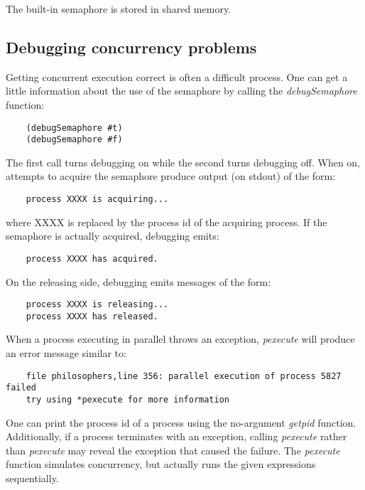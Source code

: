 The built-in semaphore is stored in shared memory.

\subsection{Debugging concurrency problems}

Getting concurrent execution correct is often a difficult process.
One can get a little information about the use of the semaphore 
by calling the {\it debugSemaphore} function:

\begin{verbatim}
    (debugSemaphore #t)
    (debugSemaphore #f)
\end{verbatim}

The first call turns debugging on while the second turns debugging off. When
on, attempts to acquire the semaphore produce output (on stdout) of
the form:

\begin{verbatim}
    process XXXX is acquiring...
\end{verbatim}

where XXXX is replaced by the process id of the acquiring process.
If the semaphore is actually acquired, debugging emits:

\begin{verbatim}
    process XXXX has acquired.
\end{verbatim}

On the releasing side, debugging emits messages of the form:

\begin{verbatim}
    process XXXX is releasing...
    process XXXX has released.
\end{verbatim}

When a process executing in parallel throws an exception, {\it pexecute} will
produce an error message similar to:

\begin{verbatim}
    file philosophers,line 356: parallel execution of process 5827 failed
    try using *pexecute for more information
\end{verbatim}

One can print the process id of a process
using the no-argument {\it getpid} function.
Additionally, if a process terminates with an exception,
calling {\it *pexecute} rather than {\it pexecute} may reveal the
exception that caused the failure.
The {\it *pexecute} function simulates concurrency, but actually runs the
given expressions sequentially.
